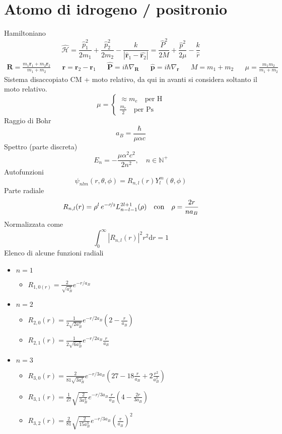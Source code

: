 \documentclass{article}
\newcommand{\deh}{\mathrm{d}}
\newcommand{\ham}{\hat{\mathcal{H}}}
\begin{document}
\section{Atomo di idrogeno / positronio}
Hamiltoniano
\[\ham=\frac{\hat{p}_1^2}{2 m_1}+\frac{\hat{p}_2^2}{2m_2}- \frac{k}{|\hat{\mathbf{r}}_1-\hat{\mathbf{r}_2}|}=\frac{\hat{P}^2}{2M}+\frac{\hat{p}^2}{2\mu}-\frac{k}{\hat{r}}\]
\begin{align*}
     \mathbf{R}=\frac{m_1 \mathbf{r}_1 + m_2 \mathbf{r}_2}{m_1+m_2} && \mathbf{r}=\mathbf{r}_2-\mathbf{r}_1 && \hat{\mathbf{P}}=i\hbar\nabla_\mathbf{R} && \hat{\mathbf{p}}=i\hbar\nabla_\mathbf{r} && M = m_1+m_2 && \mu = \frac{m_1 m_2}{m_1+m_2}
\end{align*}
Sistema disaccopiato CM + moto relativo, da qui in avanti si considera soltanto il moto relativo. 
\[\mu=\begin{cases} 
\approx m_e\quad\textrm{per H}\\
\frac{m_e}{2}\quad\textrm{per Ps}
\end{cases}
\]
Raggio di Bohr 
\[a_B=\frac{\hbar}{\mu\alpha c}\]
Spettro (parte discreta)
\[E_n=-\frac{\mu\alpha^2c^2}{2n^2},\quad n\in\mathbb{N}^+\]
Autofunzioni
\[\psi_{nlm}(r,\theta,\phi)=R_{n,l}(r)Y_l^m(\theta,\phi)\]
Parte radiale
\[R_{n,l}(r)=\rho^l\,e^{-\nicefrac{\rho}{2}}L_{n-l-1}^{2l+1}(\rho)\quad\mathrm{con}\quad \rho=\frac{2r}{na_B}\]
Normalizzata come
\[\int_0^{\infty} |R_{n,l}(r)|^2 r^2 \deh r = 1\]
Elenco di alcune funzioni radiali
\begin{itemize}
    \item $n=1$
    \begin{itemize}
        \item[] $R_{1,0(r)}=\frac{2}{\sqrt{a_B^3}}e^{-r/a_B}$
    \end{itemize}
    \item $n=2$
    \begin{itemize}
        \item[] $R_{2,0}(r)=\frac{1}{2\sqrt{2a_B^3}}e^{-r/2a_B}\left(2-\frac{r}{a_B}\right)$
        \item[] $R_{2,1}(r)=\frac{1}{2\sqrt{6a_B^3}}e^{-r/2a_B}\frac{r}{a_B}$
    \end{itemize}
    \item $n=3$
    \begin{itemize}
        \item[] $R_{3,0}(r)=\frac{2}{81\sqrt{3a_B^3}}e^{-r/3a_B}\left(27-18\frac{r}{a_B}+2\frac{r^2}{a_B^2}\right)$
        \item[] $R_{3,1}(r)=\frac{1}{27}\sqrt{\frac{2}{3a_B^3}}e^{-r/3a_B}\frac{r}{a_B}\left(4-\frac{2r}{3a_B}\right)$
        \item[] $R_{3,2}(r)=\frac{2}{81}\sqrt{\frac{2}{15a_B^3}}e^{-r/3a_B}\left(\frac{r}{a_B}\right)^2$
    \end{itemize}
\end{itemize}
\end{document}
